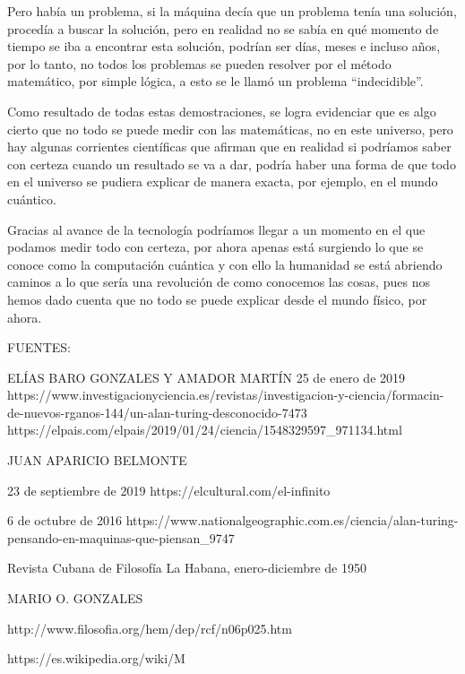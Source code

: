 \documentclass[12pt]{article}
\begin{document}
\vspace{15PT}
 Pero había un problema, si la máquina decía que un problema tenía una solución, procedía a buscar la solución, pero en realidad no se sabía en qué momento de tiempo se iba a encontrar esta solución, podrían ser días, meses e incluso años, por lo tanto, no todos los problemas se pueden resolver por el método matemático, por simple lógica, a esto se le llamó un problema “indecidible”. 

\vspace{15PT}
Como resultado de todas estas demostraciones, se logra evidenciar que es algo cierto que no todo se puede medir con las matemáticas, no en este universo, pero hay algunas corrientes científicas que afirman que en realidad si podríamos saber con certeza cuando un resultado se va a dar, podría haber una forma de que todo en el universo se pudiera explicar de manera exacta, por ejemplo, en el mundo cuántico.

\vspace{15PT}
Gracias al avance de la tecnología podríamos llegar a un momento en el que podamos medir todo con certeza, por ahora apenas está surgiendo lo que se conoce como la computación cuántica y con ello la humanidad se está abriendo caminos a lo que sería una revolución de como conocemos las cosas, pues nos hemos dado cuenta que no todo se puede explicar desde el mundo físico, por ahora. 

\vspace{15pt}


FUENTES:


\vspace{15pt}
\vspace{15pt}
ELÍAS BARO GONZALES Y AMADOR MARTÍN 
\vspace{15pt}
25 de enero de 2019
https://www.investigacionyciencia.es/revistas/investigacion-y-ciencia/formacin-de-nuevos-rganos-144/un-alan-turing-desconocido-7473
https://elpais.com/elpais/2019/01/24/ciencia/1548329597_971134.html

\vspace{15pt}

JUAN APARICIO BELMONTE

23 de septiembre de 2019
https://elcultural.com/el-infinito

\vspace{15pt}
6 de octubre de 2016
\vspace{15pt}
https://www.nationalgeographic.com.es/ciencia/alan-turing-pensando-en-maquinas-que-piensan_9747

\vspace{15pt}
Revista Cubana de Filosofía
La Habana, enero-diciembre de 1950

MARIO O. GONZALES

\vspace{15pt}
http://www.filosofia.org/hem/dep/rcf/n06p025.htm

\vspace{15pt}
https://es.wikipedia.org/wiki/M%
\end{document}
